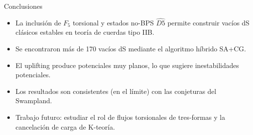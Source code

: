\documentclass[aspectratio=169]{beamer} %
\begin{document}
\begin{frame}{Conclusiones}
    \begin{itemize}
        \item La inclusión de \(F_5\) torsional y estados no-BPS \(\widehat{D5}\) permite construir vacíos dS clásicos estables en teoría de cuerdas tipo IIB.
        \item Se encontraron más de 170 vacíos dS mediante el algoritmo híbrido SA+CG.
        \item El uplifting produce potenciales muy planos, lo que sugiere inestabilidades potenciales.
        \item Los resultados son consistentes (en el límite) con las conjeturas del Swampland.
        \item Trabajo futuro: estudiar el rol de flujos torsionales de tres-formas y la cancelación de carga de K-teoría.
    \end{itemize}
\end{frame}
\end{document}
